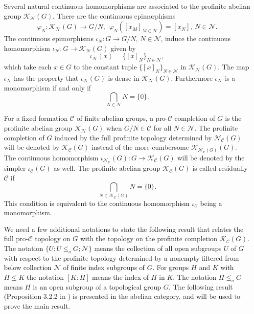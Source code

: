 \documentclass{amsart}
\theoremstyle{plain}
\theoremstyle{definition}
\theoremstyle{remark}
\begin{document}
Several natural continuous homomorphisms are associated to the profinite abelian group ${\mathcal K}_{\mathcal N}(G)$. There are the continuous epimorphisms
\[ \varphi_{N}:{\mathcal K}_{\mathcal N}(G) \to G/N, \ \ \varphi_{N}( [x_M]_{M\in{\mathcal N}}) = [x_N],\ N\in {\mathcal N}.\]
The continuous epimorphisms $\iota_N:G\to G/N$, $N\in {\mathcal N}$, induce the continuous homomorphism $\iota_{\mathcal N}:G \to {\mathcal K}_{\mathcal N}(G)$ given by
\[ \iota_{\mathcal N}(x) =  \{[x]_N\}_{N\in{\mathcal N}},\]
which take each $x\in G$ to the constant tuple $\{[x]_N\}_{N\in{\mathcal N}}$ in ${\mathcal K}_{\mathcal N}(G)$. The map $\iota_{\mathcal N}$ has the property that $\iota_{\mathcal N}(G)$ is dense in ${\mathcal K}_{\mathcal N}(G)$. Furthermore $\iota_{\mathcal N}$ is a monomorphism if and only if 
\[ \bigcap_{N\in {\mathcal N}} N = \{0\}.\]

For a fixed formation ${\mathcal C}$ of finite abelian groups, a pro-${\mathcal C}$ completion of $G$ is the profinite abelian group ${\mathcal K}_{\mathcal N}(G)$ when $G/N\in {\mathcal C}$ for all $N\in {\mathcal N}$. The profinite completion of $G$ induced by the full profinite topology determined by ${\mathcal N}_{\mathcal C}(G)$ will be denoted by ${\mathcal K}_{\mathcal C}(G)$ instead of the more cumbersome ${\mathcal K}_{ {\mathcal N}_{\mathcal C}(G)}(G)$. The continuous homomorphism $\iota_{ {\mathcal N}_{\mathcal C}}(G):G \to {\mathcal K}_{\mathcal C}(G)$ will be denoted by the simpler $\iota_{\mathcal C}(G)$ as well. The profinite abelian group ${\mathcal K}_{\mathcal C}(G)$ is called residually ${\mathcal C}$ if
\[ \bigcap_{N\in {\mathcal N}_{\mathcal C}(G)} N = \{0\}.\]
This condition is equivalent to the continuous homomorphism $\iota_{\mathcal C}$ being a monomorphism.

We need a few additional notations to state the following result that relates the full pro-${\mathcal C}$ topology on $G$ with the topology on the profinite completion ${\mathcal K}_{\mathcal C}(G)$. The notation $\{ U: U\leq_o G;{\mathcal N}\}$ means the collection of all open subgroups $U$ of $G$ with respect to the profinite topology determined by a nonempty filtered from below collection ${\mathcal N}$ of finite index subgroups of $G$. For groups $H$ and $K$ with $H\leq K$ the notation $[K:H]$ means the index of $H$ in $K$. The notation $H\leq_o G$ means $H$ is an open subgroup of a topological group $G$. The following result (Proposition 3.2.2 in \cite{RZ10}) is presented in the abelian category, and will be used to prove the main result.
\end{document}
